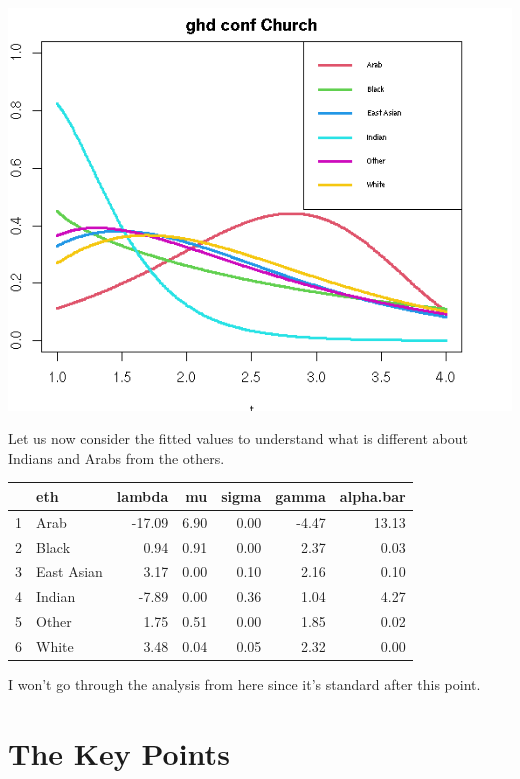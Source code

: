 \documentclass{amsart}
\begin{document}
\includegraphics[scale=0.8]{cfchurch_ghd.png}

Let us now consider the fitted values to understand what is different about Indians and Arabs from the others.

\begin{table}[ht]
\centering
\begin{tabular}{rlrrrrr}
  \hline
 & eth & lambda & mu & sigma & gamma & alpha.bar \\ 
  \hline
1 & Arab & -17.09 & 6.90 & 0.00 & -4.47 & 13.13 \\ 
  2 & Black & 0.94 & 0.91 & 0.00 & 2.37 & 0.03 \\ 
  3 & East Asian & 3.17 & 0.00 & 0.10 & 2.16 & 0.10 \\ 
  4 & Indian & -7.89 & 0.00 & 0.36 & 1.04 & 4.27 \\ 
  5 & Other & 1.75 & 0.51 & 0.00 & 1.85 & 0.02 \\ 
  6 & White & 3.48 & 0.04 & 0.05 & 2.32 & 0.00 \\ 
   \hline
\end{tabular}
\end{table}

I won't go through the analysis from here since it's standard after this point.

\section{The Key Points}
\end{document}
